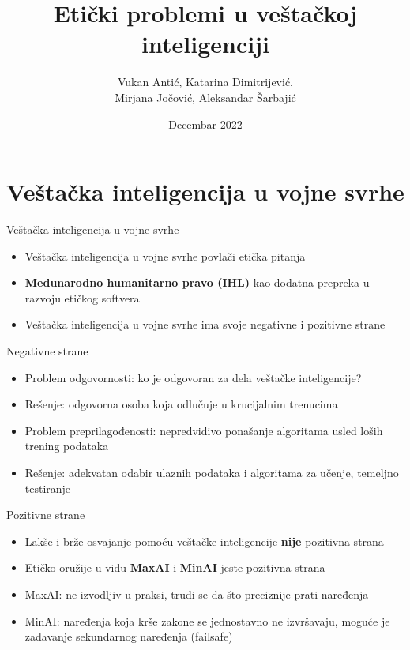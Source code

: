 \documentclass[14pt, aspectratio=169]{beamer}
\title{Etički problemi u veštačkoj inteligenciji}
\author{Vukan Antić, Katarina Dimitrijević, \\ Mirjana Jočović, Aleksandar Šarbajić}
\date{Decembar 2022}
\begin{document}
\maketitle

\section{Veštačka inteligencija u vojne svrhe}

\begin{frame}{Veštačka inteligencija u vojne svrhe}
    \begin{itemize}
    
        \item Veštačka inteligencija u vojne svrhe povlači etička pitanja
        \item \textbf{Međunarodno humanitarno pravo (IHL)} kao dodatna prepreka u razvoju etičkog softvera
        \item Veštačka inteligencija u vojne svrhe ima svoje negativne i pozitivne strane
        
    \end{itemize}
\end{frame}

\begin{frame}{Negativne strane}
    \begin{itemize}
        \item<1-> Problem odgovornosti: ko je odgovoran za dela veštačke inteligencije?
        \item<2-> Rešenje: odgovorna osoba koja odlučuje u krucijalnim trenucima
        \item<3-> Problem preprilagođenosti: nepredvidivo ponašanje algoritama usled loših trening podataka
        \item<4-> Rešenje: adekvatan odabir ulaznih podataka i algoritama za učenje, temeljno testiranje
    \end{itemize}
\end{frame}

\begin{frame}{Pozitivne strane}
    \begin{itemize}
        \item<1-> Lakše i brže osvajanje pomoću veštačke inteligencije \textbf{nije} pozitivna strana
        \item<2-> Etičko oružije u vidu \textbf{MaxAI} i \textbf{MinAI} jeste pozitivna strana
        \item<3-> MaxAI: ne izvodljiv u praksi, trudi se da što preciznije prati naređenja
        \item<4-> MinAI: naređenja koja krše zakone se jednostavno ne izvršavaju, moguće je zadavanje sekundarnog naređenja (failsafe)
    \end{itemize}    
\end{frame}
\end{document}
